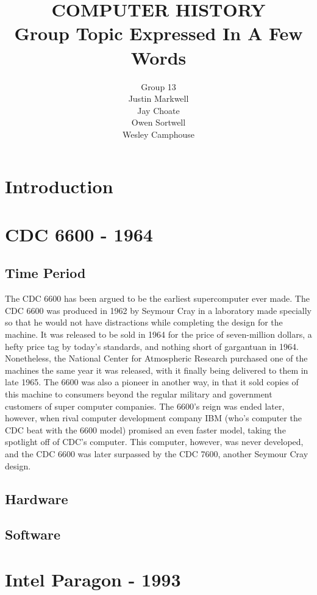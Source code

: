 \documentclass[letterpaper, 10 pt, conference]{IEEEconf}
\title{\LARGE \bf
COMPUTER HISTORY\\
\large Group Topic Expressed In A Few Words
}
\author{Group 13\\
\small Justin Markwell\\
\small Jay Choate\\
\small Owen Sortwell\\
\small Wesley Camphouse\\
}
\begin{document}
\maketitle
\thispagestyle{empty}
\pagestyle{empty}


\section{Introduction}

\section{CDC 6600 - 1964}
\subsection{Time Period}
The CDC 6600 has been argued to be the earliest supercomputer ever made. The CDC 6600 was produced in 1962 by Seymour Cray in a laboratory made specially so that he would not have distractions while completing the design for the machine. It was released to be sold in 1964 for the price of seven-million dollars, a hefty price tag by today's standards, and nothing short of gargantuan in 1964. Nonetheless, the National Center for Atmospheric Research purchased one of the machines the same year it was released, with it finally being delivered to them in late 1965. The 6600 was also a pioneer in another way, in that it sold copies of this machine to consumers beyond the regular military and government customers of super computer companies. The 6600's reign was ended later, however, when rival computer development company IBM (who's computer the CDC beat with the 6600 model) promised an even faster model, taking the spotlight off of CDC's computer. This computer, however, was never developed, and the CDC 6600 was later surpassed by the CDC 7600, another Seymour Cray design.
\subsection{Hardware}
\subsection{Software}

\section{Intel Paragon - 1993}
\end{document}
